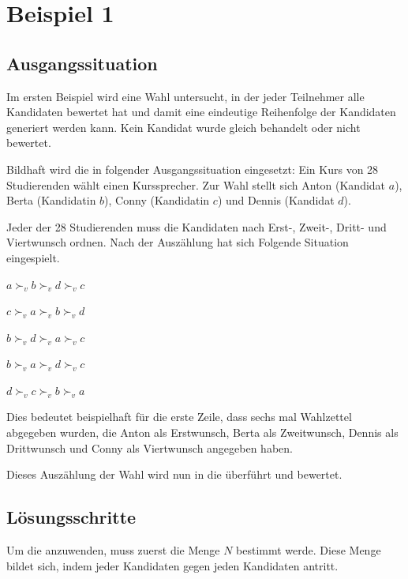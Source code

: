 \section{Beispiel 1}
\label{sec:beispiel1}


\subsection{Ausgangssituation} 
\label{sec:ausgangssituation1}
Im ersten Beispiel wird eine Wahl untersucht, in der jeder Teilnehmer alle Kandidaten bewertet hat und damit eine eindeutige Reihenfolge der Kandidaten generiert werden kann. Kein Kandidat wurde gleich behandelt oder nicht bewertet.

Bildhaft wird die \schulze in folgender Ausgangssituation eingesetzt:
Ein Kurs von 28 Studierenden wählt einen Kurssprecher. Zur Wahl stellt sich Anton (Kandidat $a$), Berta (Kandidatin $b$), Conny (Kandidatin $c$) und Dennis (Kandidat $d$).

Jeder der 28 Studierenden muss die Kandidaten nach Erst-, Zweit-, Dritt- und Viertwunsch ordnen. Nach der Auszählung hat sich Folgende Situation eingespielt. 

\begin{description}
\centering
\item[6 mal] $a \succ_{v} b \succ_{v} d \succ_{v}c$
\item[4 mal] $c \succ_{v} a \succ_{v} b \succ_{v}d$
\item[10 mal] $b \succ_{v} d \succ_{v} a \succ_{v}c$
\item[3 mal] $b \succ_{v} a \succ_{v} d \succ_{v}c$
\item[5 mal] $d \succ_{v} c \succ_{v} b \succ_{v}a$
\end{description}

Dies bedeutet beispielhaft für die erste Zeile, dass sechs mal Wahlzettel abgegeben wurden, die Anton als Erstwunsch, Berta als Zweitwunsch, Dennis als Drittwunsch und Conny als Viertwunsch angegeben haben.

Dieses Auszählung der Wahl wird nun in die \schulze überführt und bewertet.
\newpage
\subsection{Lösungsschritte} 
\label{sec:loesungen1}
Um die \schulze anzuwenden, muss zuerst die Menge $N$ bestimmt werde. Diese Menge bildet sich, indem jeder Kandidaten gegen jeden Kandidaten antritt.

